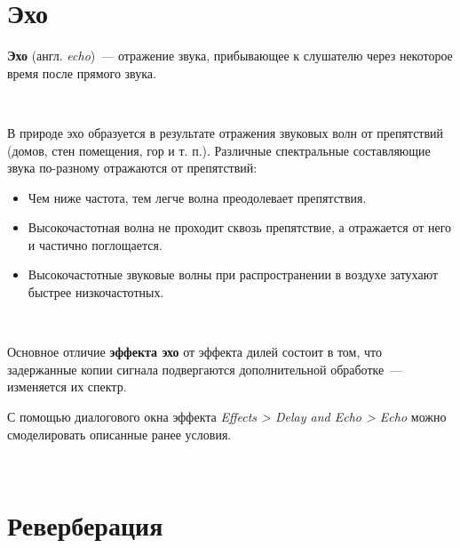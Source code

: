 \documentclass{beamer}
\begin{document}
\section{Эхо}
\begin{frame}
  \textbf{Эхо} (англ. \emph{echo})~--- отражение звука, прибывающее к слушателю через некоторое время после прямого звука.

  ~

  В природе эхо образуется в результате отражения звуковых волн от препятствий (домов, стен помещения, гор и т. п.). Различные спектральные составляющие звука по-разному отражаются от препятствий: 
  
  \begin{itemize}
    \item Чем ниже частота, тем легче волна преодолевает препятствия.
    \item Высокочастотная волна не проходит сквозь препятствие, а отражается от него и частично поглощается. 
    \item Высокочастотные звуковые волны при распространении в воздухе затухают быстрее низкочастотных.
  \end{itemize} 

  ~

  Основное отличие \textbf{эффекта эхо} от эффекта дилей состоит в том, что задержанные копии сигнала подвергаются дополнительной обработке~--- изменяется их спектр. 
\end{frame}

\begin{frame}
С помощью диалогового окна эффекта \emph{Effects > Delay and Echo > Echo} можно смоделировать описанные ранее условия.

~
  

\end{frame}

\section{Реверберация}
\end{document}
